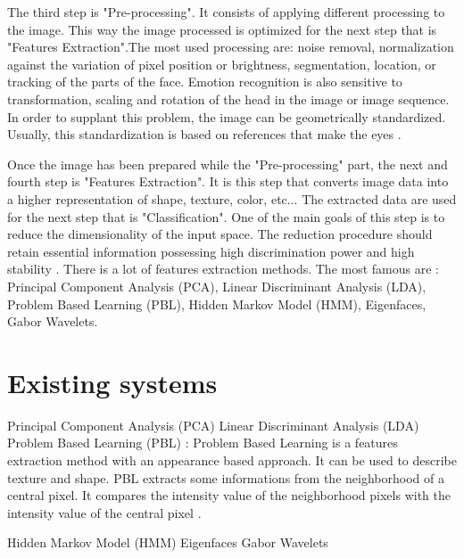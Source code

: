 \noindent The third step is "Pre-processing". It consists of applying different processing to the image. This way the image processed is optimized for the next step that is "Features Extraction".The most used processing are: noise removal, normalization against the variation of pixel position or brightness, segmentation, location, or tracking of the parts of the face. Emotion recognition is also sensitive to transformation, scaling and rotation of the head in the image or image sequence. In order to supplant this problem, the image can be geometrically standardized. Usually, this standardization is based on references that make the eyes \cite{CHI03}.
\newline

\noindent Once the image has been prepared while the "Pre-processing" part, the next and fourth step is "Features Extraction". It is this step that converts image data into a higher representation of shape, texture, color, etc... The extracted data are used for the next step that is "Classification". One of the main goals of this step is to reduce the dimensionality of the input space. The reduction procedure should retain essential information possessing high discrimination power and high stability \cite{CHI03}. There is a lot of features extraction methods. The most famous are : Principal Component Analysis (PCA), Linear Discriminant Analysis (LDA), Problem Based Learning (PBL), Hidden Markov Model (HMM), Eigenfaces, Gabor Wavelets.
\newline

\section{Existing systems}

\noindent Principal Component Analysis (PCA)
\newline
\noindent Linear Discriminant Analysis (LDA)
\newline
\noindent Problem Based Learning (PBL) : Problem Based Learning is a features extraction method with an appearance based approach. It can be used to describe texture and shape. PBL extracts some informations from the neighborhood of a central pixel. It compares the intensity value of the neighborhood pixels with the intensity value of the central pixel  \cite{GAN08}.
\newline

\noindent Hidden Markov Model (HMM)
\newline
\noindent Eigenfaces
\newline
\noindent Gabor Wavelets
\newline

